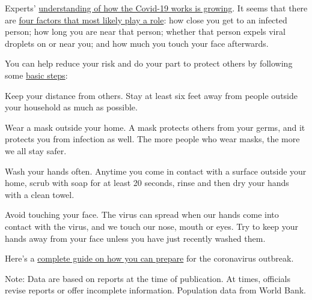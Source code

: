 Experts'
\href{https://www.nytimes.com/2020/06/02/health/coronavirus-profile-covid.html}{understanding
of how the Covid-19 works is growing}. It seems that there are
\href{https://www.nytimes.com/article/coronavirus-how-it-spreads.html}{four
factors that most likely play a role}: how close you get to an infected
person; how long you are near that person; whether that person expels
viral droplets on or near you; and how much you touch your face
afterwards.

You can help reduce your risk and do your part to protect others by
following some
\href{https://www.nytimes.com/article/prepare-for-coronavirus.html}{basic
steps}:

Keep your distance from others. Stay at least six feet away from people
outside your household as much as possible.

Wear a mask outside your home. A mask protects others from your germs,
and it protects you from infection as well. The more people who wear
masks, the more we all stay safer.

Wash your hands often. Anytime you come in contact with a surface
outside your home, scrub with soap for at least 20 seconds, rinse and
then dry your hands with a clean towel.

Avoid touching your face. The virus can spread when our hands come into
contact with the virus, and we touch our nose, mouth or eyes. Try to
keep your hands away from your face unless you have just recently washed
them.

Here's a
\href{https://www.nytimes.com/interactive/2020/world/coronavirus-tips-advice.html}{complete
guide on how you can prepare} for the coronavirus outbreak.

Note: Data are based on reports at the time of publication. At times,
officials revise reports or offer incomplete information. Population
data from World Bank.

